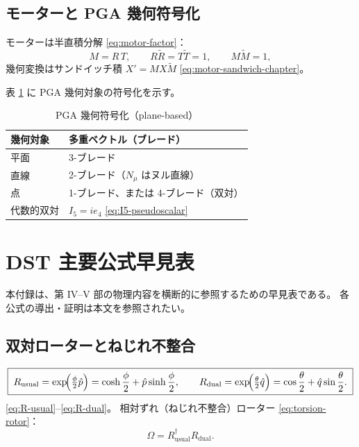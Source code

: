\documentclass[dvipdfmx,a4paper,oneside]{jsbook}
\numberwithin{equation}{chapter}
\begin{document}
\section{モーターと PGA 幾何符号化}

モーターは半直積分解 \eqref{eq:motor-factor}：
\begin{equation}
  M = R\,T, \qquad R\widetilde{R} = T\widetilde{T} = 1, \qquad M\widetilde{M} = 1,
  \label{eq:app-motor}
\end{equation}
幾何変換はサンドイッチ積 \(X' = MX\widetilde{M}\) \eqref{eq:motor-sandwich-chapter}。

表 \ref{tab:app-pga-encoding} に PGA 幾何対象の符号化を示す。

\begin{table}[htbp]
  \centering
  \caption{PGA 幾何符号化（plane-based）}
  \label{tab:app-pga-encoding}
  \begin{tabular}{@{}ll@{}}
    \toprule
    幾何対象 & 多重ベクトル（ブレード） \\
    \midrule
    平面 & 3-ブレード \\
    直線 & 2-ブレード（\(N_\mu\) はヌル直線） \\
    点 & 1-ブレード、または 4-ブレード（双対） \\
    代数的双対 & \(I_5 = ie_4\) \eqref{eq:I5-pseudoscalar} \\
    \bottomrule
  \end{tabular}
\end{table}

\chapter{DST 主要公式早見表}

本付録は、第 IV–V 部の物理内容を横断的に参照するための早見表である。
各公式の導出・証明は本文を参照されたい。

\section{双対ローターとねじれ不整合}

\begin{equation}
  \boxed{\;
  R_{\mathrm{usual}} = \exp\!\Bigl(\tfrac{\phi}{2}\hat{p}\Bigr)
  = \cosh\frac{\phi}{2} + \hat{p}\sinh\frac{\phi}{2},
  \qquad
  R_{\mathrm{dual}} = \exp\!\Bigl(\tfrac{\theta}{2}\hat{q}\Bigr)
  = \cos\frac{\theta}{2} + \hat{q}\sin\frac{\theta}{2}.
  \;}
  \label{eq:app-rotors}
\end{equation}
\eqref{eq:R-usual}–\eqref{eq:R-dual}。
相対ずれ（ねじれ不整合）ローター \eqref{eq:torsion-rotor}：
\begin{equation}
  \Omega = R_{\mathrm{usual}}^\dagger R_{\mathrm{dual}}.
  \label{eq:app-torsion}
\end{equation}
\end{document}
